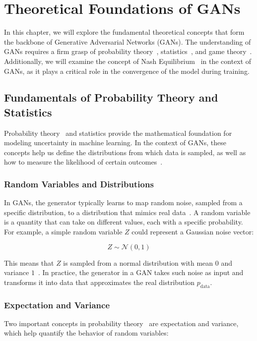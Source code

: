 \chapter{Theoretical Foundations of GANs}
In this chapter, we will explore the fundamental theoretical concepts that form the backbone of Generative Adversarial Networks (GANs). The understanding of GANs requires a firm grasp of probability theory~\cite{he2018probgan}, statistics~\cite{bau2019seeing, ma2021must}, and game theory~\cite{fudenberg1991game}. Additionally, we will examine the concept of Nash Equilibrium~\cite{daskalakis2009complexity, heusel2017gans, farnia2020gans} in the context of GANs, as it plays a critical role in the convergence of the model during training.

\section{Fundamentals of Probability Theory and Statistics}
Probability theory~\cite{he2018probgan} and statistics provide the mathematical foundation for modeling uncertainty in machine learning. In the context of GANs, these concepts help us define the distributions from which data is sampled, as well as how to measure the likelihood of certain outcomes~\cite{farnia2020gans}.

\subsection{Random Variables and Distributions}
In GANs, the generator typically learns to map random noise, sampled from a specific distribution, to a distribution that mimics real data~\cite{goodfellow2014generative}. A random variable is a quantity that can take on different values, each with a specific probability. For example, a simple random variable \( Z \) could represent a Gaussian noise vector:

\[
Z \sim \mathcal{N}(0, 1)
\]

This means that \( Z \) is sampled from a normal distribution with mean $0$ and variance $1$~\cite{goodfellow2014generative, kazeminia2020gans}. In practice, the generator in a GAN takes such noise as input and transforms it into data that approximates the real distribution \( p_{\text{data}} \).

\subsection{Expectation and Variance}
Two important concepts in probability theory~\cite{he2018probgan} are expectation and variance, which help quantify the behavior of random variables:

